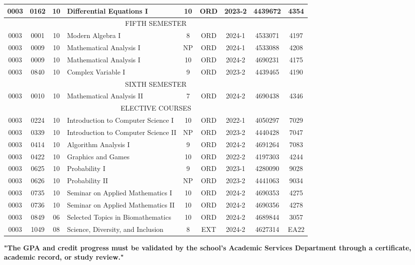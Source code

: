 \documentclass{article}
\begin{document}
{\begin{tabular}{|c|c|c|p{4cm}|c|c|c|c|c|}
    \hline
    0003 & 0162 & 10 & Differential Equations I & 10 & ORD & 2023-2 & 4439672 & 4354 \\
    \hline
    \multicolumn{9}{|c|}{FIFTH SEMESTER} \\ %
    \hline
    0003 & 0001 & 10 & Modern Algebra I & 8 & ORD & 2024-1 & 4533071 & 4197 \\
    \hline
    0003 & 0009 & 10 & Mathematical Analysis I & NP & ORD & 2024-1 & 4533088 & 4208 \\
    \hline
    0003 & 0009 & 10 & Mathematical Analysis I & 10 & ORD & 2024-2 & 4690231 & 4175 \\
    \hline
    0003 & 0840 & 10 & Complex Variable I & 9 & ORD & 2023-2 & 4439465 & 4190 \\
    \hline
    \multicolumn{9}{|c|}{SIXTH SEMESTER} \\ %
    \hline
    0003 & 0010 & 10 & Mathematical Analysis II & 7 & ORD & 2024-2 & 4690438 & 4346 \\
    \hline
    \multicolumn{9}{|c|}{ELECTIVE COURSES} \\ %
    \hline
    0003 & 0224 & 10 & Introduction to Computer Science I & 10 & ORD & 2022-1 & 4050297 & 7029 \\
    \hline
    0003 & 0339 & 10 & Introduction to Computer Science II & NP & ORD & 2023-2 & 4440428 & 7047 \\
    \hline
    0003 & 0414 & 10 & Algorithm Analysis I & 9 & ORD & 2024-2 & 4691264 & 7083 \\
    \hline
    0003 & 0422 & 10 & Graphics and Games & 10 & ORD & 2022-2 & 4197303 & 4244 \\
    \hline
    0003 & 0625 & 10 & Probability I & 9 & ORD & 2023-1 & 4280090 & 9028 \\
    \hline
    0003 & 0626 & 10 & Probability II & NP & ORD & 2023-2 & 4441063 & 9034 \\
    \hline
    0003 & 0735 & 10 & Seminar on Applied Mathematics I & 10 & ORD & 2024-2 & 4690353 & 4275 \\
    \hline
    0003 & 0736 & 10 & Seminar on Applied Mathematics II & 10 & ORD & 2024-2 & 4690356 & 4278 \\
    \hline
    0003 & 0849 & 06 & Selected Topics in Biomathematics & 10 & ORD & 2024-2 & 4689844 & 3057 \\
    \hline
    0003 & 1049 & 08 & Science, Diversity, and Inclusion & 8 & EXT & 2024-2 & 4627314 & EA22 \\
    \hline
\end{tabular}%
} %

\begin{center}
    \textbf{"The GPA and credit progress must be validated by the school's Academic Services Department through a certificate, academic record, or study review."}
\end{center}
\end{document}

